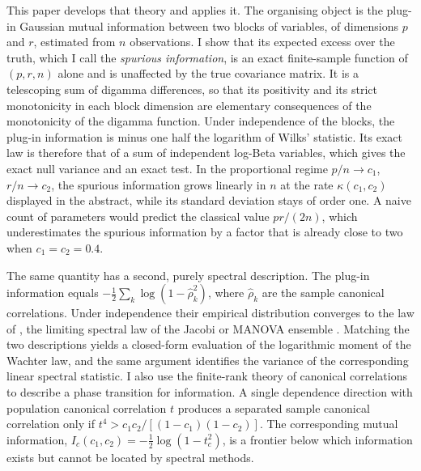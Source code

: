 This paper develops that theory and applies it. The organising object is the plug-in Gaussian mutual information between two blocks of variables, of dimensions $p$ and $r$, estimated from $n$ observations. I show that its expected excess over the truth, which I call the \emph{spurious information}, is an exact finite-sample function of $(p,r,n)$ alone and is unaffected by the true covariance matrix. It is a telescoping sum of digamma differences, so that its positivity and its strict monotonicity in each block dimension are elementary consequences of the monotonicity of the digamma function. Under independence of the blocks, the plug-in information is minus one half the logarithm of Wilks' statistic. Its exact law is therefore that of a sum of independent log-Beta variables, which gives the exact null variance and an exact test. In the proportional regime $p/n\to c_1$, $r/n\to c_2$, the spurious information grows linearly in $n$ at the rate $\kappa(c_1,c_2)$ displayed in the abstract, while its standard deviation stays of order one. A naive count of parameters would predict the classical value $pr/(2n)$, which underestimates the spurious information by a factor that is already close to two when $c_1=c_2=0.4$.

The same quantity has a second, purely spectral description. The plug-in information equals $-\tfrac12\sum_k\log(1-\hat\rho_k^2)$, where $\hat\rho_k$ are the sample canonical correlations. Under independence their empirical distribution converges to the law of \citet{wachter1980limiting}, the limiting spectral law of the Jacobi or MANOVA ensemble \citep{johnstone2008multivariate,collins2005product}. Matching the two descriptions yields a closed-form evaluation of the logarithmic moment of the Wachter law, and the same argument identifies the variance of the corresponding linear spectral statistic. I also use the finite-rank theory of canonical correlations \citep{bao2019canonical} to describe a phase transition for information. A single dependence direction with population canonical correlation $t$ produces a separated sample canonical correlation only if $t^4>c_1c_2/[(1-c_1)(1-c_2)]$. The corresponding mutual information, $I_c(c_1,c_2)=-\tfrac12\log(1-t_c^2)$, is a frontier below which information exists but cannot be located by spectral methods.

